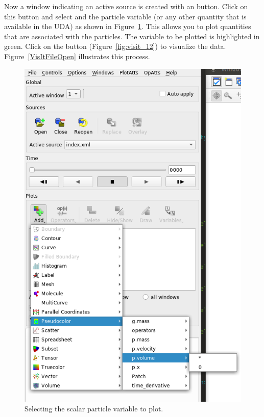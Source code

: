 \begin{paracol}{2}
  \switchcolumn
  Now a window indicating an active source is created with an 
  button.  Click on this button and select  and the
  particle variable  (or any other quantity that is
  available in the UDA) as shown in Figure~\ref{fig:visit_10}.
  This allows you to plot  quantities that are associated
  with the \MPM particles.
  The variable to be plotted is highlighted in green.  Click on the 
  button (Figure~\ref{fig:visit_12}) to visualize the data.
  Figure~\ref{VisItFileOpen} illustrates this process.

  \begin{figure}[htb!]
    \centering
    \includegraphics[width=0.5\columnwidth]{FIGS/visit/visit_10.png}
    \caption{Selecting the scalar particle variable to plot.}
    \label{fig:visit_10}
  \end{figure}

  \switchcolumn


\end{paracol}
